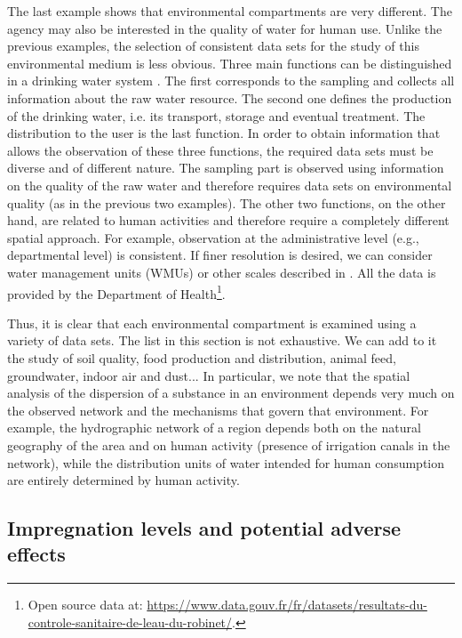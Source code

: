 The last example shows that environmental compartments are very different. The agency may also be interested in the quality of water for human use. Unlike the previous examples, the selection of consistent data sets for the study of this environmental medium is less obvious. Three main functions can be distinguished in a drinking water system \cite{renaud:hal-01218670}. The first corresponds to the sampling and collects all information about the raw water resource. The second one defines the production of the drinking water, i.e. its transport, storage and eventual treatment. The distribution to the user is the last function. In order to obtain information that allows the observation of these three functions, the required data sets must be diverse and of different nature.  The sampling part is observed using information on the quality of the raw water and therefore requires data sets on environmental quality (as in the previous two examples). The other two functions, on the other hand, are related to human activities and therefore require a completely different spatial approach. For example, observation at the administrative level (e.g., departmental level) is consistent. If finer resolution is desired, we can consider water management units (WMUs) or other scales described in \cite{renaud:hal-01218670}. All the data is provided by the Department of Health\footnote{Open source data at: \url{https://www.data.gouv.fr/fr/datasets/resultats-du-controle-sanitaire-de-leau-du-robinet/}.}. 

Thus, it is clear that each environmental compartment is examined using a variety of data sets. The list in this section is not exhaustive. We can add to it the study of soil quality, food production and distribution, animal feed, groundwater, indoor air and dust... In particular, we note that the spatial analysis of the dispersion of a substance in an environment depends very much on the observed network and the mechanisms that govern that environment. For example, the hydrographic network of a region depends both on the natural geography of the area and on human activity (presence of irrigation canals in the network), while the distribution units of water intended for human consumption are entirely determined by human activity. 
 
\subsection{Impregnation levels and potential adverse effects}

